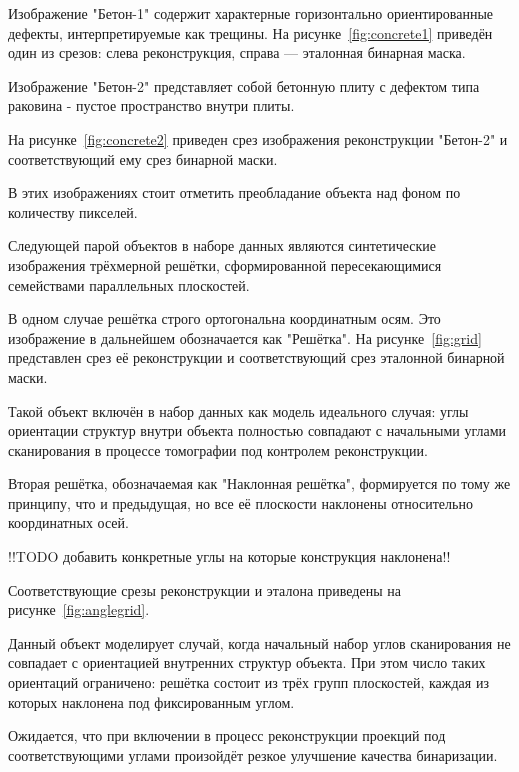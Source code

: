 Изображение "Бетон-1" содержит характерные горизонтально ориентированные дефекты, интерпретируемые как трещины. На рисунке~\ref{fig:concrete1} приведён один из срезов: слева реконструкция, справа — эталонная бинарная маска.


Изображение "Бетон-2" представляет собой бетонную плиту с дефектом типа раковина - пустое пространство внутри плиты.

На рисунке~\ref{fig:concrete2} приведен срез изображения реконструкции "Бетон-2" и соответствующий ему срез бинарной маски.



В этих изображениях стоит отметить преобладание объекта над фоном по количеству пикселей.

Следующей парой объектов в наборе данных являются синтетические изображения трёхмерной решётки, сформированной пересекающимися семействами параллельных плоскостей. 

В одном случае решётка строго ортогональна координатным осям. Это изображение в дальнейшем обозначается как "Решётка". На рисунке~\ref{fig:grid} представлен срез её реконструкции и соответствующий срез эталонной бинарной маски.

Такой объект включён в набор данных как модель идеального случая: углы ориентации структур внутри объекта полностью совпадают с начальными углами сканирования в процессе томографии под контролем реконструкции.


Вторая решётка, обозначаемая как "Наклонная решётка", формируется по тому же принципу, что и предыдущая, но все её плоскости наклонены относительно координатных осей.

!!TODO добавить конкретные углы на которые конструкция наклонена!!

Соответствующие срезы реконструкции и эталона приведены на рисунке~\ref{fig:anglegrid}.

Данный объект моделирует случай, когда начальный набор углов сканирования не совпадает с ориентацией внутренних структур объекта. При этом число таких ориентаций ограничено: решётка состоит из трёх групп плоскостей, каждая из которых наклонена под фиксированным углом.

Ожидается, что при включении в процесс реконструкции проекций под соответствующими углами произойдёт резкое улучшение качества бинаризации.

